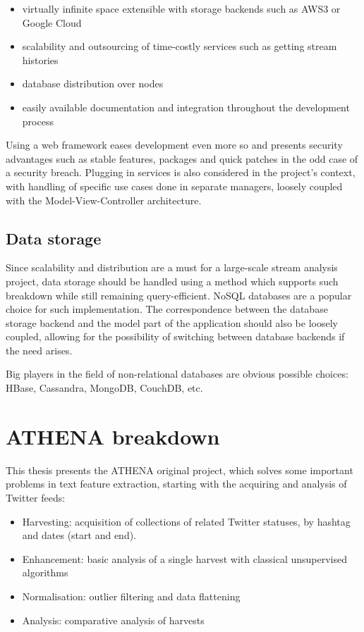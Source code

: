 \begin{itemize}
\item virtually infinite space extensible with storage backends such as AWS3 or Google Cloud
\item scalability and outsourcing of time-costly services such as getting stream histories
\item database distribution over nodes
\item easily available documentation and integration throughout the development process
\end{itemize} 

Using a web framework eases development even more so and presents security advantages such as stable features, packages and quick patches in the odd case of a security breach. Plugging in services is also considered in the project's context, with handling of specific use cases done in separate managers, loosely coupled with the Model-View-Controller architecture.

\subsection{Data storage}
Since scalability and distribution are a must for a large-scale stream analysis project, data storage should be handled using a method which supports such breakdown while still remaining query-efficient. NoSQL databases are a popular choice for such implementation. The correspondence between the database storage backend and the model part of the application should also be loosely coupled, allowing for the possibility of switching between database backends if the need arises.

Big players in the field of non-relational databases are obvious possible choices: HBase, Cassandra, MongoDB, CouchDB, etc.

\section{ATHENA breakdown}
This thesis presents the ATHENA original project, which solves some important problems in text feature extraction, starting with the acquiring and analysis of Twitter feeds:

\begin{itemize}
\item Harvesting: acquisition of collections of related Twitter statuses, by hashtag and dates (start and end).
\item Enhancement: basic analysis of a single harvest with classical unsupervised algorithms
\item Normalisation: outlier filtering and data flattening 
\item Analysis: comparative analysis of harvests
\end{itemize}

